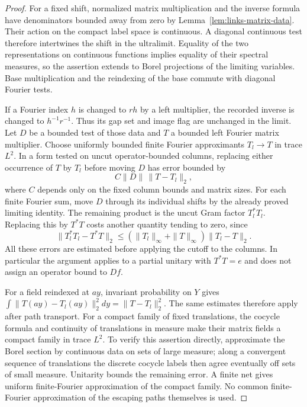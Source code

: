 \begin{proof}
For a fixed shift, normalized matrix multiplication and the inverse
formula have denominators bounded away from zero by
Lemma~\ref{lem:links-matrix-data}. Their action on the compact label
space is continuous. A diagonal continuous test therefore
intertwines the shift in the ultralimit. Equality of the two
representations on continuous functions implies equality of their
spectral measures, so the assertion extends to Borel projections of
the limiting variables. Base multiplication and the reindexing of
the base commute with diagonal Fourier tests.

If a Fourier index \(h\) is changed to \(rh\) by a left
multiplier, the recorded inverse is changed to \(h^{-1}r^{-1}\).
Thus its gap set and image flag are unchanged in the limit. Let
\(D\) be a bounded test of those data and \(T\) a bounded left
Fourier matrix multiplier. Choose uniformly bounded finite Fourier
approximants \(T_l\to T\) in trace \(L^2\). In a form tested on
uncut operator-bounded columns, replacing either occurrence of
\(T\) by \(T_l\) before moving \(D\) has error bounded by
\[
 C\|D\|\,\|T-T_l\|_2,
\]
where \(C\) depends only on the fixed column bounds and matrix
sizes. For each finite Fourier sum, move \(D\) through its
individual shifts by the already proved limiting identity. The
remaining product is the uncut Gram factor \(T_l^*T_l\). Replacing
this by \(T^*T\) costs another quantity tending to zero, since
\[
 \|T_l^*T_l-T^*T\|_2
 \leq (\|T_l\|_\infty+\|T\|_\infty)\|T_l-T\|_2.
\]
All these errors are estimated before applying the cutoff to the
columns. In particular the argument applies to a partial unitary
with \(T^*T=e\) and does not assign an operator bound to \(Df\).

For a field reindexed at \(ay\), invariant probability on \(Y\)
gives
\(\int\|T(ay)-T_l(ay)\|_2^2dy=\|T-T_l\|_2^2\).
The same estimates therefore apply after path transport. For a
compact family of fixed translations, the cocycle formula and
continuity of translations in measure make their matrix fields a
compact family in trace \(L^2\). To verify this assertion directly,
approximate the Borel section by continuous data on sets of large
measure; along a convergent sequence of translations the discrete
cocycle labels then agree eventually off sets of small measure.
Unitarity bounds the remaining error. A finite net gives uniform
finite-Fourier approximation of the compact family. No common
finite-Fourier approximation of the escaping paths themselves is
used.


\end{proof}
